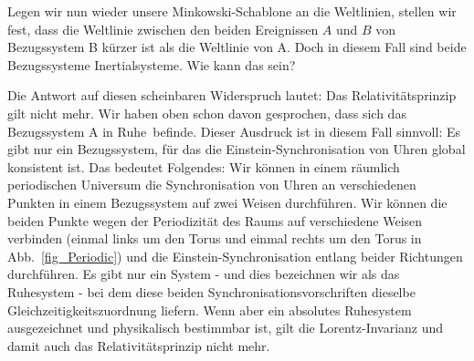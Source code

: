 Legen wir nun wieder unsere Minkowski-Schablone an die Weltlinien, stellen wir
fest, dass die Weltlinie zwischen den beiden Ereignissen $A$ und $B$ von Bezugssystem B 
k\"urzer ist als die Weltlinie von A. Doch in diesem Fall sind beide Bezugssysteme
Inertialsysteme. Wie kann das sein?

Die Antwort auf diesen scheinbaren Widerspruch lautet: Das Relativit\"atsprinzip gilt
nicht mehr. 
Wir haben oben schon davon gesprochen, dass sich das Bezugssystem
A \glqq in Ruhe\grqq\ befinde. Dieser Ausdruck ist in diesem Fall sinnvoll:
Es gibt nur ein Bezugssystem, f\"ur das die Einstein-Synchronisation von Uhren
global konsistent ist. Das bedeutet Folgendes: Wir k\"onnen in einem r\"aumlich
periodischen Universum die Synchronisation von Uhren an verschiedenen Punkten 
in einem Bezugssystem auf zwei Weisen durchf\"uhren. Wir k\"onnen die beiden Punkte
wegen der Periodizit\"at des Raums auf verschiedene Weisen verbinden (einmal links um
den Torus und einmal rechts um den Torus in Abb.\ \ref{fig_Periodic}) und die Einstein-Synchronisation
entlang beider Richtungen durchf\"uhren. Es gibt nur ein System - und dies bezeichnen wir als
das Ruhesystem - bei dem diese beiden Synchronisationsvorschriften dieselbe Gleichzeitigkeitszuordnung
liefern. Wenn aber ein absolutes Ruhesystem ausgezeichnet und physikalisch
bestimmbar ist, gilt die Lorentz-Invarianz und damit auch das Relativit\"atsprinzip nicht mehr. 

%

